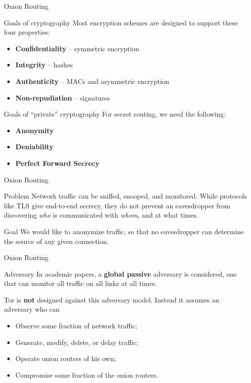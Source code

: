 \documentclass[12pt]{beamer}
\begin{document}
\begin{frame}{Onion Routing}
	\begin{block}{Goals of cryptography}
		Most encryption schemes are designed to support these four properties:
		\begin{itemize}
			\item \textbf{Confidentiality} -- symmetric encryption
			\item \textbf{Integrity} -- hashes
			\item \textbf{Authenticity} -- MACs and asymmetric encryption
			\item \textbf{Non-repudiation} -- signatures
		\end{itemize}
	\end{block}

	\begin{block}{Goals of ``private'' cryptography}
		For secret routing, we need the following:
		\begin{itemize}
			\item \textbf{Anonymity}
			\item \textbf{Deniability}
			\item \textbf{Perfect Forward Secrecy}
		\end{itemize}
	\end{block}
\end{frame}

\begin{frame}{Onion Routing}
	\begin{block}{Problem}
		Network traffic can be sniffed, snooped, and monitored. While protocols
		like TLS give end-to-end secrecy, they do not prevent an eavesdropper
		from discovering \textit{who} is communicated with \textit{whom}, and at
		what times.
	\end{block}
	\begin{block}{Goal}
		We would like to anonymize traffic, so that no  eavesdropper can
		determine the source of any given connection.
	\end{block}
\end{frame}

\begin{frame}{Onion Routing}
	\begin{block}{Adversary}
		In academic papers, a \textbf{global passive} adversary is considered,
		one that can monitor all traffic on all links at all times.

		Tor is \textbf{not} designed against this adversary model. Instead it
		assumes an adversary who can
		\begin{itemize}
			\item Observe some fraction of network traffic;
			\item Generate, modify, delete, or delay traffic;
			\item Operate onion routers of his own;
			\item Compromise some fraction of the onion routers.
		\end{itemize}
	\end{block}
\end{frame}
\end{document}
